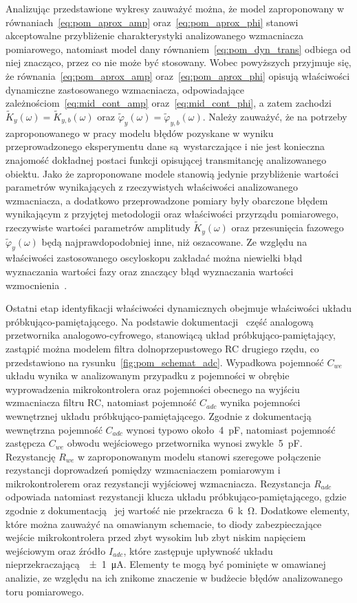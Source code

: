 Analizując przedstawione wykresy zauważyć można, że model zaproponowany w równaniach~\eqref{eq:pom_aprox_amp} oraz~\eqref{eq:pom_aprox_phi} stanowi akceptowalne przybliżenie charakterystyki analizowanego wzmacniacza pomiarowego, natomiast model dany równaniem~\eqref{eq:pom_dyn_trans} odbiega od niej znacząco, przez co nie może być stosowany. Wobec powyższych przyjmuje się, że równania~\eqref{eq:pom_aprox_amp} oraz~\eqref{eq:pom_aprox_phi} opisują właściwości dynamiczne zastosowanego wzmacniacza, odpowiadające zależnościom~\eqref{eq:mid_cont_amp} oraz~\eqref{eq:mid_cont_phi}, a zatem zachodzi $\tilde{K}_{y}(\omega) = \tilde{K}_{y,b}(\omega)$ oraz $\tilde{\varphi}_{y}(\omega) = \tilde{\varphi}_{y,b}(\omega)$. Należy zauważyć, że na potrzeby zaproponowanego w pracy modelu błędów pozyskane w wyniku przeprowadzonego eksperymentu dane są wystarczające i nie jest konieczna znajomość dokładnej postaci funkcji opisującej transmitancję analizowanego obiektu. Jako że zaproponowane modele stanowią jedynie przybliżenie wartości parametrów wynikających z rzeczywistych właściwości analizowanego wzmacniacza, a dodatkowo przeprowadzone pomiary były obarczone błędem wynikającym z przyjętej metodologii oraz właściwości przyrządu pomiarowego, rzeczywiste wartości parametrów amplitudy $\tilde{K}_{y}(\omega)$ oraz przesunięcia fazowego $\tilde{\varphi}_{y}(\omega)$ będą najprawdopodobniej inne, niż oszacowane. Ze względu na właściwości zastosowanego oscyloskopu zakładać można niewielki błąd wyznaczania wartości fazy oraz znaczący błąd wyznaczania wartości wzmocnienia~\cite{rigol_dso}.

Ostatni etap identyfikacji właściwości dynamicznych obejmuje właściwości układu próbkująco-pamiętającego. Na podstawie dokumentacji~\cite{stm_f411} część analogową przetwornika analogowo-cyfrowego, stanowiącą układ próbkująco-pamiętający, zastąpić można modelem filtra dolnoprzepustowego RC drugiego rzędu, co przedstawiono na rysunku~\ref{fig:pom_schemat_adc}. Wypadkowa pojemność $C_{we}$ układu wynika w analizowanym przypadku z pojemności w obrębie wyprowadzenia mikrokontrolera oraz pojemności obecnego na wyjściu wzmacniacza filtru RC, natomiast pojemność $C_{adc}$ wynika pojemności wewnętrznej układu próbkująco-pamiętającego. Zgodnie z dokumentacją~\cite{stm_f411} wewnętrzna pojemność $C_{adc}$ wynosi typowo około~\qty{4}{pF}, natomiast pojemność zastępcza $C_{we}$ obwodu wejściowego przetwornika wynosi zwykle~\qty{5}{pF}. Rezystancję $R_{we}$ w zaproponowanym modelu stanowi szeregowe połączenie rezystancji doprowadzeń pomiędzy wzmacniaczem pomiarowym i mikrokontrolerem oraz rezystancji wyjściowej wzmacniacza. Rezystancja $R_{adc}$ odpowiada natomiast rezystancji klucza układu próbkująco-pamiętającego, gdzie zgodnie z dokumentacją~\cite{stm_f411} jej wartość nie przekracza~\qty{6}{k\ohm}. Dodatkowe elementy, które można zauważyć na omawianym schemacie, to diody zabezpieczające wejście mikrokontrolera przed zbyt wysokim lub zbyt niskim napięciem wejściowym oraz źródło $I_{adc}$, które zastępuje upływność układu nieprzekraczającą~\qty{\pm 1}{\micro A}. Elementy te mogą być pominięte w omawianej analizie, ze względu na ich znikome znaczenie w budżecie błędów analizowanego toru pomiarowego.


